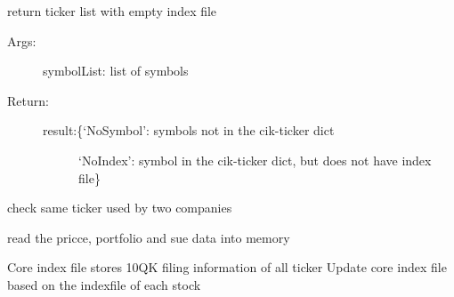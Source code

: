 \documentclass[letterpaper,10pt,english]{sphinxmanual}
\begin{document}

\begin{fulllineitems}
\label{DataGenerator:DataGenerator.checkEmpty}
return ticker list with empty index file
\begin{description}
\item[{Args:}] \leavevmode
symbolList: list of symbols

\item[{Return:}] \leavevmode\begin{description}
\item[{result:\{`NoSymbol': symbols not in the cik-ticker dict}] \leavevmode
`NoIndex': symbol in the cik-ticker dict, but does not have index file\}

\end{description}

\end{description}

\end{fulllineitems}


\begin{fulllineitems}
\label{DataGenerator:DataGenerator.cleanPrice}
check same ticker used by two companies

\end{fulllineitems}


\begin{fulllineitems}
\label{DataGenerator:DataGenerator.loadData}
read the pricce, portfolio and sue data into memory

\end{fulllineitems}


\begin{fulllineitems}
\label{DataGenerator:DataGenerator.updateCoreIndex}
Core index file stores 10QK filing information of all ticker
Update core index file based on the indexfile of each stock

\end{fulllineitems}
\end{document}
